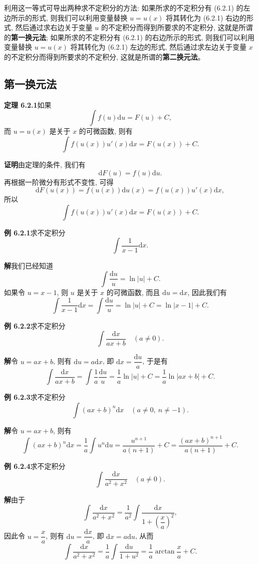 \documentclass[UTF8,12pt,a4paper,fontset=fandol]{ctexart}
\begin{document}
利用这一等式可导出两种求不定积分的方法: 如果所求的不定积分有 (6.2.1) 的左边所示的形式, 则我们可以利用变量替换 $u=u(x)$ 将其转化为 (6.2.1) 右边的形式, 然后通过求右边关于变量 $u$ 的不定积分而得到所要求的不定积分, 这就是所谓的\textbf{第一换元法}; 如果所求的不定积分有 (6.2.1) 的右边所示的形式, 则我们可以利用变量替换 $u=u(x)$ 将其转化为 (6.2.1) 左边的形式, 然后通过求左边关于变量 $x$ 的不定积分而得到所要求的不定积分, 这就是所谓的\textbf{第二换元法}。

\subsection{第一换元法}

\noindent\textbf{定理 6.2.1}\quad 如果
\[
  \int f(u)\mathrm du=F(u)+C,
\]
而 $u=u(x)$ 是关于 $x$ 的可微函数, 则有
\[
  \int f(u(x))u'(x)\mathrm dx=F(u(x))+C.
\]

\noindent\textbf{证明}\quad 由定理的条件, 我们有
\[
  \mathrm dF(u)=f(u)\mathrm du.
\]
再根据一阶微分有形式不变性, 可得
\[
  \mathrm dF(u(x))=f(u(x))\mathrm du(x)=f(u(x))u'(x)\mathrm dx,
\]
所以
\[
  \int f(u(x))u'(x)\mathrm dx=F(u(x))+C.
\]

\noindent\textbf{例 6.2.1}\quad 求不定积分
\[
  \int\frac1{x-1}\mathrm dx.
\]

\noindent\textbf{解}\quad 我们已经知道
\[
  \int\frac{\mathrm du}{u}=\ln|u|+C.
\]
如果令 $u=x-1$, 则 $u$ 是关于 $x$ 的可微函数, 而且 $\mathrm du=\mathrm dx$, 因此我们有
\[
  \int\frac1{x-1}\mathrm dx
  =
  \int\frac{\mathrm du}{u}
  =
  \ln|u|+C
  =
  \ln|x-1|+C.
\]

\noindent\textbf{例 6.2.2}\quad 求不定积分
\[
  \int\frac{\mathrm dx}{ax+b}\quad (a\ne0).
\]

\noindent\textbf{解}\quad 令 $u=ax+b$, 则有 $\mathrm du=a\mathrm dx$, 即 $\mathrm dx=\dfrac{\mathrm du}{a}$, 于是有
\[
  \int\frac{\mathrm dx}{ax+b}
  =
  \int\frac1a\frac{\mathrm du}{u}
  =
  \frac1a\ln|u|+C
  =
  \frac1a\ln|ax+b|+C.
\]

\noindent\textbf{例 6.2.3}\quad 求不定积分
\[
  \int(ax+b)^n\mathrm dx\quad (a\ne0,\ n\ne-1).
\]

\noindent\textbf{解}\quad 令 $u=ax+b$, 则有
\[
  \int(ax+b)^n\mathrm dx
  =
  \frac1a\int u^n\mathrm du
  =
  \frac{u^{n+1}}{a(n+1)}+C
  =
  \frac{(ax+b)^{n+1}}{a(n+1)}+C.
\]

\noindent\textbf{例 6.2.4}\quad 求不定积分
\[
  \int\frac{\mathrm dx}{a^2+x^2}\quad (a\ne0).
\]

\noindent\textbf{解}\quad 由于
\[
  \int\frac{\mathrm dx}{a^2+x^2}
  =
  \frac1{a^2}\int\frac{\mathrm dx}{1+\left(\dfrac xa\right)^2},
\]
因此令 $u=\dfrac xa$, 则有 $\mathrm du=\dfrac{\mathrm dx}{a}$, 即 $\mathrm dx=a\mathrm du$, 从而
\[
  \int\frac{\mathrm dx}{a^2+x^2}
  =
  \frac1a\int\frac{\mathrm du}{1+u^2}
  =
  \frac1a\arctan\frac xa+C.
\]
\end{document}
